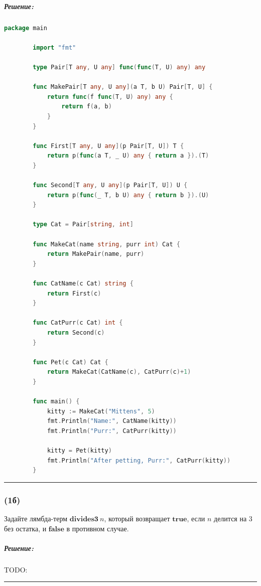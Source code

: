 \documentclass{article}
\newenvironment{proof}{\subparagraph{\hspace{-1em}Решение:\newline}}{\par\noindent\rule{\textwidth}{0.4pt}}
\newcommand{\term}[1]{\mathbf{#1}}
\begin{document}
    \begin{proof}
        \begin{lstlisting}[language=Go,label={lst:cats}]
        package main
        
        import "fmt"
        
        type Pair[T any, U any] func(func(T, U) any) any
        
        func MakePair[T any, U any](a T, b U) Pair[T, U] {
        	return func(f func(T, U) any) any {
        		return f(a, b)
        	}
        }
        
        func First[T any, U any](p Pair[T, U]) T {
        	return p(func(a T, _ U) any { return a }).(T)
        }
        
        func Second[T any, U any](p Pair[T, U]) U {
        	return p(func(_ T, b U) any { return b }).(U)
        }
        
        type Cat = Pair[string, int]
        
        func MakeCat(name string, purr int) Cat {
        	return MakePair(name, purr)
        }
        
        func CatName(c Cat) string {
        	return First(c)
        }
        
        func CatPurr(c Cat) int {
        	return Second(c)
        }
        
        func Pet(c Cat) Cat {
        	return MakeCat(CatName(c), CatPurr(c)+1)
        }
        
        func main() {
        	kitty := MakeCat("Mittens", 5)
        	fmt.Println("Name:", CatName(kitty))
        	fmt.Println("Purr:", CatPurr(kitty))
        
        	kitty = Pet(kitty)
        	fmt.Println("After petting, Purr:", CatPurr(kitty))
        }
        \end{lstlisting}
    \end{proof}

    \subsubsection{(1б)}

    Задайте лямбда-терм $\term{divides3}~n$, который возвращает $\term{true}$, если $n$ делится на 3 без остатка, и $\term{false}$ в противном случае.

    \begin{proof}
        TODO: %
    \end{proof}
\end{document}
